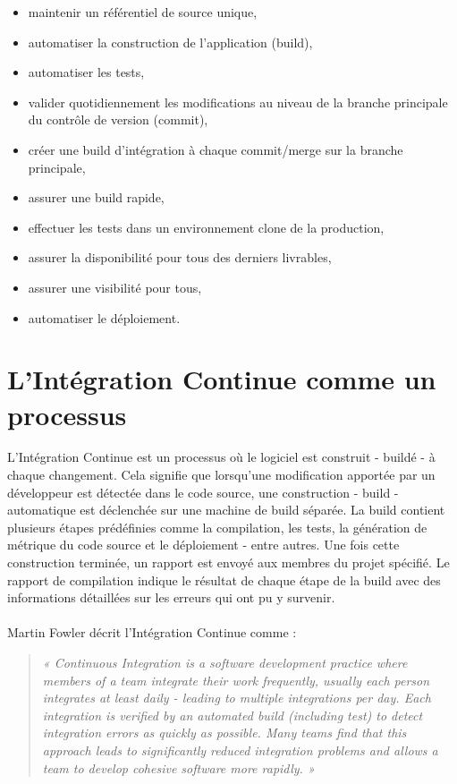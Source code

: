   \begin{itemize}
    \item maintenir un référentiel de source unique,
    \item automatiser la construction de l’application (build),
    \item automatiser les tests,
    \item valider quotidiennement les modifications au niveau de la branche principale du contrôle de version (commit),
    \item créer une build d’intégration à chaque commit/merge sur la branche principale,
    \item assurer une build rapide,
    \item effectuer les tests dans un environnement clone de la production,
    \item assurer la disponibilité pour tous des derniers livrables,
    \item assurer une visibilité pour tous,
    \item automatiser le déploiement.\\
  \end{itemize}

  \section{L'Intégration Continue comme un processus}
  L’Intégration Continue est un processus où le logiciel est construit - buildé - à chaque changement. Cela signifie que lorsqu’une modification apportée par un développeur est détectée dans le code source, une construction - build - automatique est déclenchée sur une machine de build séparée. La build contient plusieurs étapes prédéfinies comme la compilation, les tests, la génération de métrique du code source et le déploiement - entre autres. Une fois cette construction terminée, un rapport est envoyé aux membres du projet spécifié. Le rapport de compilation indique le résultat de chaque étape de la build avec des informations détaillées sur les erreurs qui ont pu y survenir.\\\\

  Martin Fowler \cite{Fow00} décrit l’Intégration Continue comme :\\
  \begin{quotation}
    \emph{« Continuous Integration is a software development practice where members of a team integrate their work frequently, usually each person integrates at least daily - leading to multiple integrations per day. Each integration is verified by an automated build (including test) to detect integration errors as quickly as possible. Many teams find that this approach leads to significantly reduced integration problems and allows a team to develop cohesive software more rapidly. »}
  \end{quotation}

